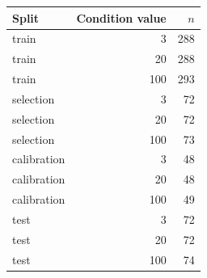 \begin{tabular}{lrr}
\toprule
Split & Condition value & $n$\\
\midrule
train & 3 & 288\\
train & 20 & 288\\
train & 100 & 293\\
selection & 3 & 72\\
selection & 20 & 72\\
selection & 100 & 73\\
calibration & 3 & 48\\
calibration & 20 & 48\\
calibration & 100 & 49\\
test & 3 & 72\\
test & 20 & 72\\
test & 100 & 74\\
\bottomrule
\end{tabular}
